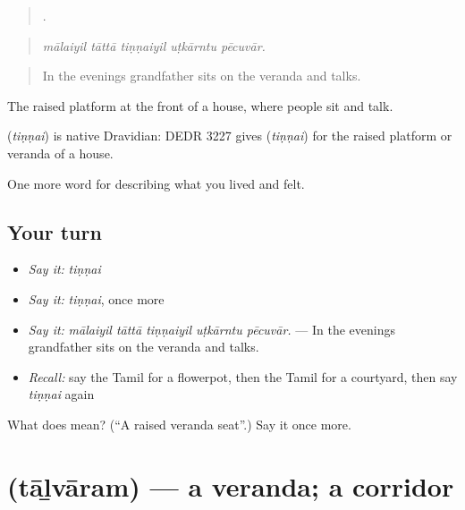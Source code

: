 \begin{quote}
    .
\end{quote}

\begin{quote}
\emph{mālaiyil tāttā tiṇṇaiyil uṭkārntu pēcuvār.}
\end{quote}

\begin{quote}
In the evenings grandfather sits on the veranda and talks.
\end{quote}

The raised platform at the front of a house, where people sit and talk.

\begin{cousinweb}
\textbf{} (\emph{tiṇṇai}) is native Dravidian: DEDR 3227 gives  (\emph{tiṇṇai}) for the raised platform or veranda of a house.
\end{cousinweb}

\begin{grammarlens}[title={What you've built}]
One more word for describing what you lived and felt.
\end{grammarlens}

\subsection*{Your turn}
\begin{itemize}
\raggedright
  \item \emph{Say it:} \emph{tiṇṇai}
  \item \emph{Say it:} \emph{tiṇṇai}, once more
  \item \emph{Say it:} \emph{mālaiyil tāttā tiṇṇaiyil uṭkārntu pēcuvār.} — In the evenings grandfather sits on the veranda and talks.
  \item \emph{Recall:} say the Tamil for a flowerpot, then the Tamil for a courtyard, then say \emph{tiṇṇai} again
\end{itemize}

\begin{tcolorbox}[breakable,colback=teal!4,colframe=teal!35!black,title={Before you move on}]
What does  mean? (\textquotedblleft{}A raised veranda seat\textquotedblright{}.) Say it once more.
\end{tcolorbox}
\section[\texorpdfstring{\ta{தாழ்வாரம்} (tāḻvāram)}{தாழ்வாரம் (tāḻvāram)}]{ (tāḻvāram) — a veranda; a corridor}

